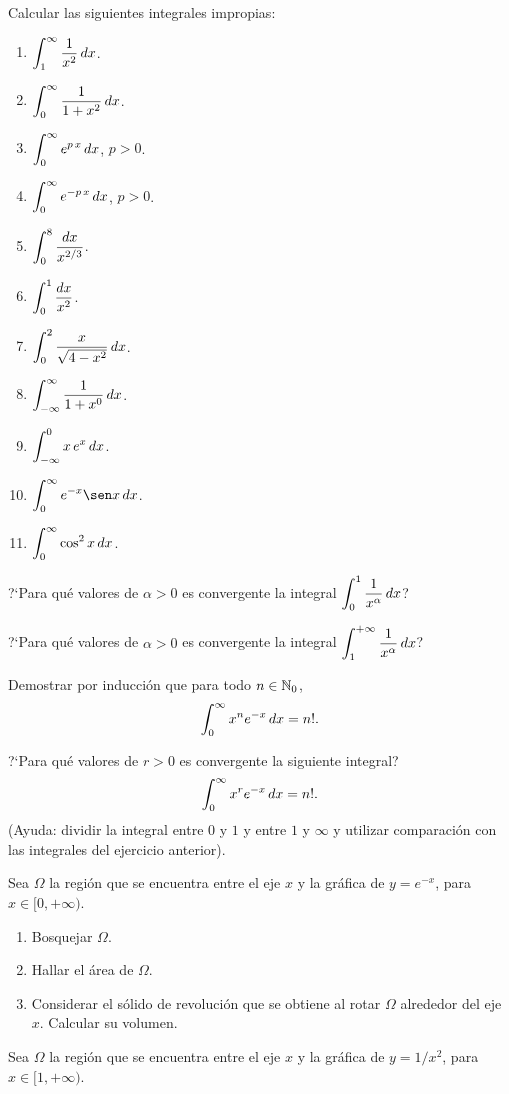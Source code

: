 \item Calcular las siguientes integrales impropias:
\begin{multicols}{2}
\begin{enumerate}
  \item $\displaystyle \int_1^\infty \frac1{x^2} \,dx$.
  \item $\displaystyle \int_0^\infty \frac1{1+x^2} \,dx$.
  \item $\displaystyle \int_0^\infty e^{p\,x}  \,dx$, $p>0$.
  \item $\displaystyle \int_0^\infty e^{-p\,x}  \,dx$, $p>0$.
  \item $\displaystyle \int_0^8 \frac{dx}{x^{2/3}}$.
  \item $\displaystyle \int_0^1 \frac{dx}{x^2}$.
  \item $\displaystyle \int_0^2 \frac{x}{\sqrt{4-x^2}}  \,dx$.
  \item $\displaystyle \int_{-\infty}^\infty \frac1{1+x^0}  \,dx$.
  \item $\displaystyle \int_{-\infty}^0 x\,e^x  \,dx$.
  \item $\D \int_0^\infty e^{-x}\sen x  \dx$.
  \item $\displaystyle \int_0^\infty \cos^2 x  \,dx$.
\end{enumerate}  
\end{multicols}
\item ?`Para qué valores de $\alpha>0$ es convergente la integral $\displaystyle \int_0^1 \frac1{x^\alpha}\,dx$?
\item ?`Para qué valores de $\alpha>0$ es convergente la integral $\displaystyle \int_1^{+\infty} \frac1{x^\alpha}\,dx$?
\item Demostrar por inducción que para todo $n\in\mathbb{N}_0$,
\[
\int_0^\infty x^n e^{-x}\,dx = n!.
\]
\item ?`Para qué valores de $r>0$ es convergente la siguiente integral?
\[
\int_0^\infty x^r e^{-x}\,dx = n!.
\]
(Ayuda: dividir la integral entre $0$ y $1$ y entre $1$ y $\infty$ y utilizar comparación con las integrales del ejercicio anterior).
\item Sea $\Omega$ la región que se encuentra entre el eje $x$ y la gráfica de $y=e^{-x}$, para $x\in[0,+\infty)$.
\begin{enumerate}
  \item Bosquejar $\Omega$.
  \item Hallar el área de $\Omega$.
  \item Considerar el sólido de revolución que se obtiene al rotar $\Omega$ alrededor del eje $x$. Calcular su volumen.
\end{enumerate}
\item Sea $\Omega$ la región que se encuentra entre el eje $x$ y la gráfica de $y=1/x^2$, para $x\in[1,+\infty)$.

